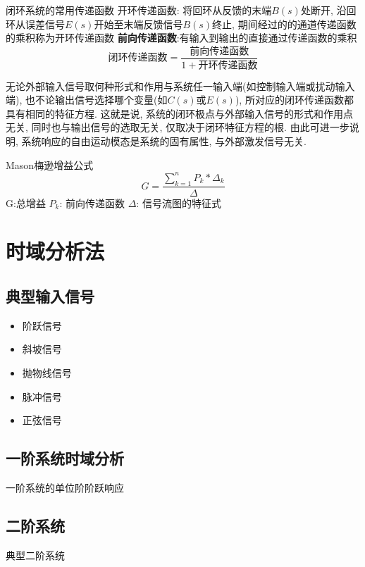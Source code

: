 闭环系统的常用传递函数\newline
开环传递函数: 将回环从反馈的末端$B(s)$处断开, 沿回环从误差信号$E(s)$开始至末端反馈信号$B(s)$终止, 期间经过的的通道传递函数的乘积称为开环传递函数\newline
\textbf{前向传递函数}:有输入到输出的直接通过传递函数的乘积
\begin{equation}
		\text{闭环传递函数} = \frac{\text{前向传递函数}}{1+\text{开环传递函数}}
\end{equation}

无论外部输入信号取何种形式和作用与系统任一输入端(如控制输入端或扰动输入端), 也不论输出信号选择哪个变量(如$C(s)$或$E(s)$), 所对应的闭环传递函数都具有相同的特征方程. \newline
这就是说, 系统的闭环极点与外部输入信号的形式和作用点无关, 同时也与输出信号的选取无关, 仅取决于闭环特征方程的根.\newline
由此可进一步说明, 系统响应的自由运动模态是系统的固有属性, 与外部激发信号无关.


Mason梅逊增益公式
\begin{equation}
		G = \frac{\sum_{k=1}^n P_k * \Delta_k}{\Delta}
\end{equation}
G:总增益\newline
$P_k$: 前向传递函数\newline
$\Delta$: 信号流图的特征式

\section{时域分析法}
\subsection{典型输入信号}
\begin{itemize}
	\item 阶跃信号
	\item 斜坡信号
	\item 抛物线信号
	\item 脉冲信号
	\item 正弦信号
\end{itemize}

\subsection{一阶系统时域分析}
一阶系统的单位阶阶跃响应
\subsection{二阶系统}
典型二阶系统

